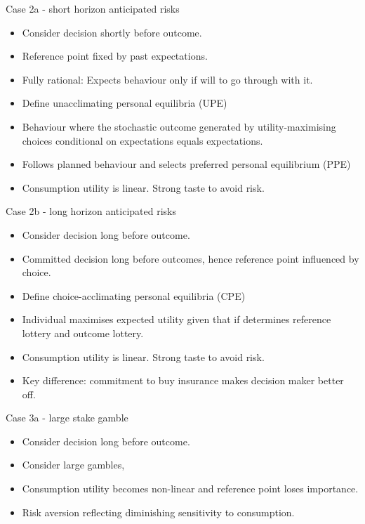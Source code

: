  \begin{frame}{Case 2a - short horizon anticipated risks}
    \begin{itemize}
    \item Consider decision shortly before outcome.\medskip
    \item Reference point fixed by past expectations.\medskip
    \item  Fully rational: Expects behaviour only if will to go through with it.\medskip
            \item Define unacclimating personal equilibria (UPE)\medskip
            \item Behaviour where the stochastic outcome generated by utility-maximising choices conditional on expectations equals expectations.\medskip
            \item Follows planned behaviour and selects preferred personal equilibrium (PPE)\medskip
           \item Consumption utility is linear. Strong taste to avoid risk.\medskip
            \end{itemize}
            \end{frame}


     \begin{frame}{Case 2b - long horizon anticipated risks}
    \begin{itemize}
    \item Consider decision long before outcome.\medskip
       \item Committed decision long before outcomes, hence reference point influenced by choice.\medskip
            \item Define choice-acclimating personal equilibria (CPE)\medskip
            \item Individual maximises expected utility given that if determines reference lottery and outcome lottery.\medskip
           \item Consumption utility is linear. Strong taste to avoid risk.\medskip
           \item Key difference: commitment to buy insurance makes decision maker better off.\medskip
    \end{itemize}
\end{frame}

     \begin{frame}{Case 3a - large stake gamble}
    \begin{itemize}
    \item Consider decision long before outcome.\medskip
     \item Consider large gambles,
     \item Consumption utility becomes non-linear and  reference point loses importance.\medskip
     \item Risk aversion reflecting diminishing sensitivity to consumption.\medskip  \end{itemize}
\end{frame}



